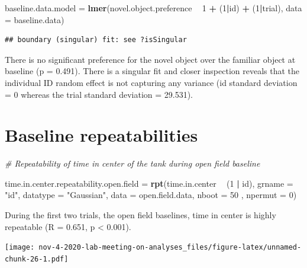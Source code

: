 \documentclass[]{book}
\newenvironment{Shaded}{\begin{snugshade}}{\end{snugshade}}
\newcommand{\KeywordTok}[1]{\textcolor[rgb]{0.13,0.29,0.53}{\textbf{#1}}}
\newcommand{\DataTypeTok}[1]{\textcolor[rgb]{0.13,0.29,0.53}{#1}}
\newcommand{\DecValTok}[1]{\textcolor[rgb]{0.00,0.00,0.81}{#1}}
\newcommand{\StringTok}[1]{\textcolor[rgb]{0.31,0.60,0.02}{#1}}
\newcommand{\CommentTok}[1]{\textcolor[rgb]{0.56,0.35,0.01}{\textit{#1}}}
\newcommand{\OperatorTok}[1]{\textcolor[rgb]{0.81,0.36,0.00}{\textbf{#1}}}
\newcommand{\NormalTok}[1]{#1}
\begin{document}
\begin{Shaded}
\begin{Highlighting}[]
\NormalTok{baseline.data.model =}\StringTok{ }
\StringTok{  }\KeywordTok{lmer}\NormalTok{(novel.object.preference }\OperatorTok{~}\StringTok{ }\DecValTok{1} \OperatorTok{+}\StringTok{ }\NormalTok{(}\DecValTok{1}\OperatorTok{|}\NormalTok{id) }\OperatorTok{+}\StringTok{ }\NormalTok{(}\DecValTok{1}\OperatorTok{|}\NormalTok{trial), }
       \DataTypeTok{data =}\NormalTok{ baseline.data)}
\end{Highlighting}
\end{Shaded}

\begin{verbatim}
## boundary (singular) fit: see ?isSingular
\end{verbatim}

There is no significant preference for the novel object over the
familiar object at baseline (p = 0.491). There is a singular fit and
closer inspection reveals that the individual ID random effect is not
capturing any variance (id standard deviation = 0 whereas the trial
standard deviation = 29.531).

\chapter{Baseline repeatabilities}\label{baseline-repeatabilities}

\begin{Shaded}
\begin{Highlighting}[]
\CommentTok{# Repeatability of time in center of the tank during open field baseline }

\NormalTok{time.in.center.repeatability.open.field =}\StringTok{ }
\StringTok{  }\KeywordTok{rpt}\NormalTok{(time.in.center }\OperatorTok{~}\StringTok{ }\NormalTok{(}\DecValTok{1} \OperatorTok{|}\StringTok{ }\NormalTok{id), }\DataTypeTok{grname =} \StringTok{"id"}\NormalTok{, }\DataTypeTok{datatype =} \StringTok{"Gaussian"}\NormalTok{,}
      \DataTypeTok{data =}\NormalTok{ open.field.data, }\DataTypeTok{nboot =} \DecValTok{50}\NormalTok{ , }\DataTypeTok{npermut =} \DecValTok{0}\NormalTok{) }
\end{Highlighting}
\end{Shaded}

During the first two trials, the open field baselines, time in center is
highly repeatable (R = 0.651, p \textless{} 0.001).

\texttt{[image: nov-4-2020-lab-meeting-on-analyses\_files/figure-latex/unnamed-chunk-26-1.pdf]}
\end{document}
